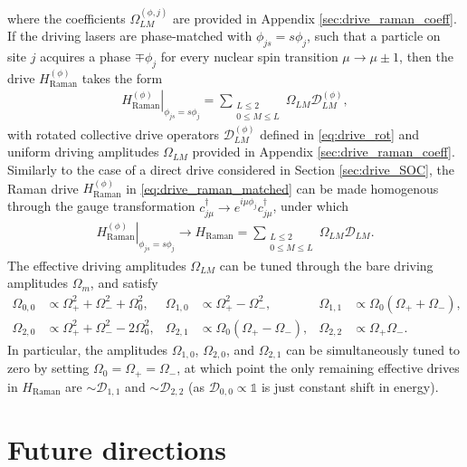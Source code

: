 \documentclass[nofootinbib,notitlepage,11pt]{revtex4-2}
\renewcommand{\t}{\text} %
\newcommand{\p}[1]{\left(#1\right)} %
\newcommand{\1}{\mathds{1}}
\newcommand{\D}{\mathcal{D}}
\begin{document}
where the coefficients $\Omega_{LM}^{(\phi,j)}$ are provided in
Appendix \ref{sec:drive_raman_coeff}.  If the driving lasers are
phase-matched with $\phi_{js}=s\phi_j$, such that a particle on site
$j$ acquires a phase $\mp\phi_j$ for every nuclear spin transition
$\mu\to\mu\pm1$, then the drive $H_{\t{Raman}}^{(\phi)}$ takes the
form
\begin{align}
  \left. H_{\t{Raman}}^{(\phi)} \right|_{\phi_{js}=s\phi_j}
  = \sum_{\substack{L\le2\\0\le M\le L}} \Omega_{LM} \D_{LM}^{(\phi)},
  \label{eq:drive_raman_matched}
\end{align}
with rotated collective drive operators $\D_{LM}^{(\phi)}$ defined in
\eqref{eq:drive_rot} and uniform driving amplitudes $\Omega_{LM}$
provided in Appendix \ref{sec:drive_raman_coeff}.  Similarly to the
case of a direct drive considered in Section \ref{sec:drive_SOC}, the
Raman drive $H_{\t{Raman}}^{(\phi)}$ in \eqref{eq:drive_raman_matched}
can be made homogenous through the gauge transformation
$c_{j\mu}^\dag \to e^{i\mu\phi_j} c_{j\mu}^\dag$, under which
\begin{align}
  \left. H_{\t{Raman}}^{(\phi)} \right|_{\phi_{js}=s\phi_j}
  \to H_{\t{Raman}}
  = \sum_{\substack{L\le2\\0\le M\le L}} \Omega_{LM} \D_{LM}.
\end{align}
The effective driving amplitudes $\Omega_{LM}$ can be tuned through
the bare driving amplitudes $\Omega_m$, and satisfy
\begin{align}
  \Omega_{0,0} &\propto \Omega_+^2 + \Omega_-^2 + \Omega_0^2,
  &
  \Omega_{1,0} &\propto \Omega_+^2 - \Omega_-^2,
  &
  \Omega_{1,1} &\propto \Omega_0 \p{\Omega_+ + \Omega_-}, \\
  \Omega_{2,0} &\propto \Omega_+^2 + \Omega_-^2 - 2\Omega_0^2,
  &
  \Omega_{2,1} &\propto \Omega_0 \p{\Omega_+ - \Omega_-},
  &
  \Omega_{2,2} &\propto \Omega_+ \Omega_-.
\end{align}
In particular, the amplitudes $\Omega_{1,0}$, $\Omega_{2,0}$, and
$\Omega_{2,1}$ can be simultaneously tuned to zero by setting
$\Omega_0=\Omega_+=\Omega_-$, at which point the only remaining
effective drives in $H_{\t{Raman}}$ are $\sim\D_{1,1}$ and
$\sim\D_{2,2}$ (as $\D_{0,0}\propto\1$ is just constant shift in
energy).

\section{Future directions}
\end{document}
